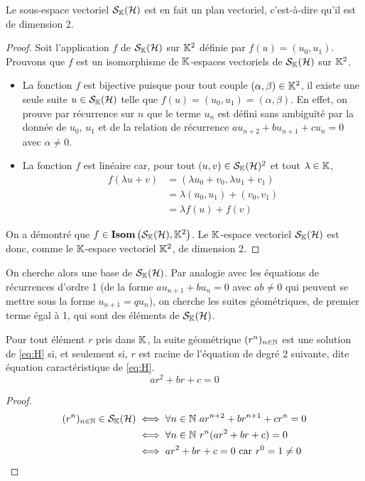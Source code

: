 \begin{prop}
  Le sous-espace vectoriel \(\mathcal{S}_{\mathbb{K}}(\mathcal{H})\) est en fait un plan vectoriel,
  c'est-à-dire qu'il est de dimension 2.
\end{prop}
\begin{proof}
  Soit l'application \(f\) de \(\mathcal{S}_{\mathbb{K}}(\mathcal{H})\) sur \(\mathbb{K}^2\) définie par
  \(f(u)=(u_0,u_1)\). Prouvons que \(f\) est un isomorphisme de \(\mathbb{K}\)-espaces
  vectoriels de \(\mathcal{S}_{\mathbb{K}}(\mathcal{H})\) sur \(\mathbb{K}^2\).
  \begin{itemize}
    \item La fonction \(f\) est bijective puisque pour tout couple \((\alpha,
      \beta) \in \mathbb{K}^2\), il existe une seule suite \(u \in \mathcal{S}_{\mathbb{K}}(\mathcal{H})\) telle que
      \(f(u)=(u_0,u_1)=(\alpha,\beta)\). En effet, on prouve par récurrence sur
      \(n\) que le terme \(u_n\) est défini sans ambiguïté par la donnée de
      \(u_0\), \(u_1\) et de la relation de récurrence
      \(au_{n+2}+bu_{n+1}+cu_n=0\) avec \(\alpha \neq 0\).
    \item La fonction \(f\) est linéaire car, pour tout \((u,v) \in
      \mathcal{S}_{\mathbb{K}}(\mathcal{H})^2\) et tout \(\lambda \in \mathbb{K}\),
      \begin{align}
        f(\lambda u+v) &=(\lambda u_0 +v_0, \lambda u_1+v_1) \\
        &=\lambda (u_0,u_1) +(v_0,v_1)\\
        &=\lambda f(u)+f(v)
      \end{align}
  \end{itemize}
  On a démontré que \(f \in \mathbf{Isom}\left(\mathcal{S}_{\mathbb{K}}(\mathcal{H}),\mathbb{K}^2\right)\). Le \(\mathbb{K}\)-espace vectoriel
  \(\mathcal{S}_{\mathbb{K}}(\mathcal{H})\) est donc, comme le \(\mathbb{K}\)-espace vectoriel \(\mathbb{K}^2\), de
  dimension 2.
\end{proof}

On cherche alors une base de \(\mathcal{S}_{\mathbb{K}}(\mathcal{H})\). Par analogie avec les équations de
récurrences d'ordre 1 (de la forme \(au_{n+1}+bu_n =0\) avec \(ab \neq 0\) qui
peuvent se mettre sous la forme \(u_{n+1}=qu_n\)), on cherche les suites
géométriques, de premier terme égal à 1, qui sont des éléments de \(\mathcal{S}_{\mathbb{K}}(\mathcal{H})\).

\begin{prop}
  Pour tout élément \(r\) pris dans \(\mathbb{K}\), la suite géométrique \((r^n)_{n \in
  \mathbb{N}}\) est une solution de \eqref{eq:H} si, et seulement si, \(r\) est racine
  de l'équation de degré 2 suivante, dite équation caractéristique de
  \eqref{eq:H}.
  \begin{equation}
    ar^2+br+c=0 \label{eq:EC} \tag{E.C.}
  \end{equation}
\end{prop}
\begin{proof}
  \begin{align}
    (r^n)_{n \in  \N} \in \S_\K(\H) &\iff \forall n \in \N \ ar^{n+2}
    +br^{n+1}+cr^n = 0 \\
    &\iff \forall n \in \N \ r^n(ar^2+br+c)=0\\
    &\iff ar^2+br+c=0 \text{~car } r^0=1 \neq 0
  \end{align}
\end{proof}

